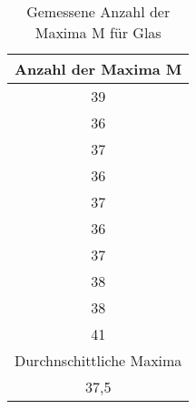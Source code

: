 \begin{table}[H] 
    \centering 
    \caption{Gemessene Anzahl der Maxima M für Glas } 
    \label{tab:M} 
    \begin{tabular} { c } 
  \toprule 
  {Anzahl der Maxima M} \\ 
     \midrule 
     39 \\
     36 \\
     37 \\
     36 \\
     37 \\
     36 \\
     37 \\
     38 \\
     38 \\
     41 \\ 
     \bottomrule 
     {Durchnschittliche Maxima } \\
     \bottomrule 
      37,5
   \end{tabular}
 \end{table}